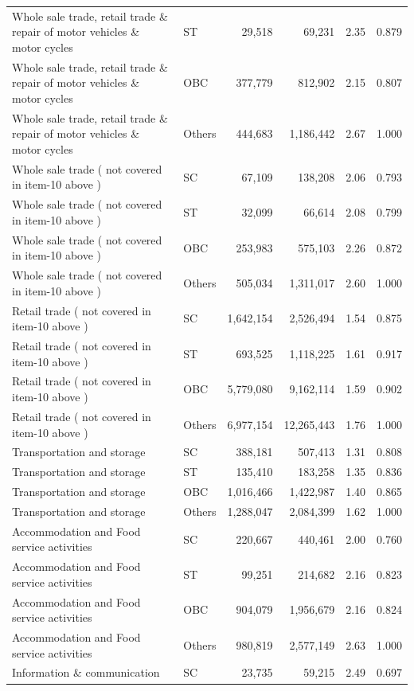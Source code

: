 \documentclass[11pt,a4paper]{report}
\begin{document}
\begin{longtable}{>{\raggedright\arraybackslash}p{5cm}lrrrr}
Whole sale trade, retail trade \& repair of motor vehicles \& motor cycles & ST & 29,518 & 69,231 & 2.35 & 0.879 \\
Whole sale trade, retail trade \& repair of motor vehicles \& motor cycles & OBC & 377,779 & 812,902 & 2.15 & 0.807 \\
Whole sale trade, retail trade \& repair of motor vehicles \& motor cycles & Others & 444,683 & 1,186,442 & 2.67 & 1.000 \\
Whole sale trade ( not covered in item-10 above ) & SC & 67,109 & 138,208 & 2.06 & 0.793 \\
Whole sale trade ( not covered in item-10 above ) & ST & 32,099 & 66,614 & 2.08 & 0.799 \\
Whole sale trade ( not covered in item-10 above ) & OBC & 253,983 & 575,103 & 2.26 & 0.872 \\
Whole sale trade ( not covered in item-10 above ) & Others & 505,034 & 1,311,017 & 2.60 & 1.000 \\
Retail trade ( not covered in item-10 above ) & SC & 1,642,154 & 2,526,494 & 1.54 & 0.875 \\
Retail trade ( not covered in item-10 above ) & ST & 693,525 & 1,118,225 & 1.61 & 0.917 \\
Retail trade ( not covered in item-10 above ) & OBC & 5,779,080 & 9,162,114 & 1.59 & 0.902 \\
Retail trade ( not covered in item-10 above ) & Others & 6,977,154 & 12,265,443 & 1.76 & 1.000 \\
Transportation and storage & SC & 388,181 & 507,413 & 1.31 & 0.808 \\
Transportation and storage & ST & 135,410 & 183,258 & 1.35 & 0.836 \\
Transportation and storage & OBC & 1,016,466 & 1,422,987 & 1.40 & 0.865 \\
Transportation and storage & Others & 1,288,047 & 2,084,399 & 1.62 & 1.000 \\
Accommodation and Food service activities & SC & 220,667 & 440,461 & 2.00 & 0.760 \\
Accommodation and Food service activities & ST & 99,251 & 214,682 & 2.16 & 0.823 \\
Accommodation and Food service activities & OBC & 904,079 & 1,956,679 & 2.16 & 0.824 \\
Accommodation and Food service activities & Others & 980,819 & 2,577,149 & 2.63 & 1.000 \\
Information \& communication & SC & 23,735 & 59,215 & 2.49 & 0.697 \\

\end{longtable}
\end{document}
